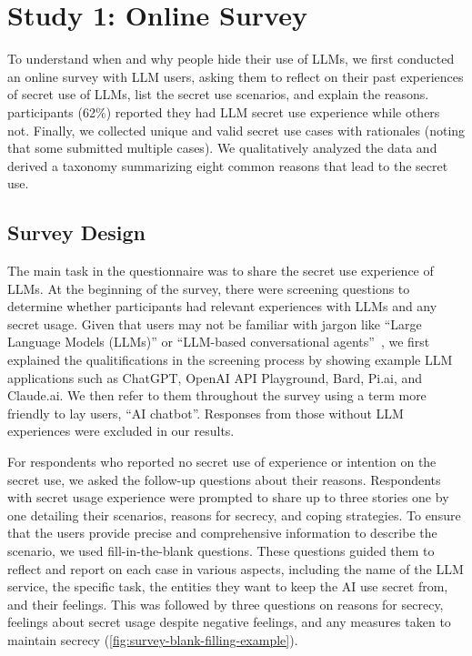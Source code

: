 \section{Study 1: Online Survey}

To understand when and why people hide their use of LLMs, we first conducted an online survey with \surveyallusernumber{} LLM users, asking them to reflect on their past experiences of secret use of LLMs, list the secret use scenarios, and explain the reasons.
\surveyconcernedusernumber{} participants (62\%) reported they had LLM secret use experience while others not. 
Finally, we collected \surveycasenumber{} unique and valid secret use cases with rationales (noting that some submitted multiple cases).
We qualitatively analyzed the data and derived a taxonomy summarizing eight common reasons that lead to the secret use.


\subsection{Survey Design}
The main task in the questionnaire was to share the secret use experience of LLMs.
At the beginning of the survey, there were screening questions to determine whether participants had relevant experiences with LLMs and any secret usage.
Given that users may not be familiar with jargon like ``Large Language Models (LLMs)'' or ``LLM-based conversational agents''~\cite{zhang2024s}, we first explained the qualitifications in the screening process by showing example LLM applications such as ChatGPT, OpenAI API Playground, Bard, Pi.ai, and Claude.ai.
We then refer to them throughout the survey using a term more friendly to lay users, ``AI chatbot''.
Responses from those without LLM experiences were excluded in our results.

For respondents who reported no secret use of experience or intention on the secret use, we asked the follow-up questions about their reasons.
Respondents with secret usage experience were prompted to share up to three stories one by one detailing their scenarios, reasons for secrecy, and coping strategies.
To ensure that the users provide precise and comprehensive information to describe the scenario, we used fill-in-the-blank questions.
These questions guided them to reflect and report on each case in various aspects, including the name of the LLM service, the specific task, the entities they want to keep the AI use secret from, and their feelings.
This was followed by three questions on reasons for secrecy, feelings about secret usage despite negative feelings, and any measures taken to maintain secrecy (\autoref{fig:survey-blank-filling-example}).



